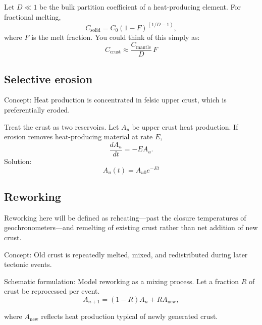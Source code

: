\documentclass[11pt,a4paper]{article}
\begin{document}
Let $D \ll 1$ be the bulk partition coefficient of a heat-producing element.
For fractional melting,
\[
C_{\text{solid}} = C_0 (1 - F)^{(1/D - 1)},
\]
where $F$ is the melt fraction.  You could think of this simply as:
\[
C_{\text{crust}} \approx \frac{C_{\text{mantle}}}{D} \, F
\]



\subsection*{Selective erosion}
Concept: Heat production is concentrated in felsic upper crust, which is preferentially eroded.

Treat the crust as two reservoirs.  Let $A_u$ be upper crust heat production.  If erosion removes heat-producing material at rate $E$,
\[
\frac{dA_u}{dt} = -E A_u.
\]
Solution:
\[
A_u(t) = A_{u0} e^{-Et}
\]



\subsection*{Reworking}
Reworking here will be defined as reheating---past the closure temperatures of geochronometers---and remelting of existing crust rather than net addition of new crust.

Concept: Old crust is repeatedly melted, mixed, and redistributed during later tectonic events.

Schematic formulation: Model reworking as a mixing process.  Let a fraction $R$ of crust be reprocessed per event.
\[
A_{n+1} = (1 - R) A_n + R A_{\text{new}},
\]

where \(A_{\text{new}}\) reflects heat production typical of newly generated crust.


\end{document}
